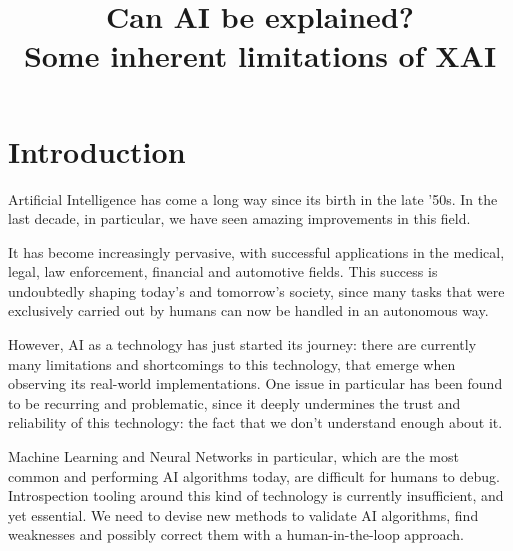 \documentclass[conference]{IEEEtran}
\newcommand{\note}{\todo[]}
\begin{document}
\title{Can AI be explained?\\
    Some inherent limitations of XAI}

\author{
}

\maketitle

\begin{abstract}
\end{abstract}

\section{Introduction}
\label{sec:intro}

Artificial Intelligence has come a long way since its birth in the late '50s.
\note {cit?} In the last decade, in particular, we have seen amazing
improvements in this field.

It has become increasingly pervasive, with successful applications in the
medical, legal, law enforcement, financial and automotive fields. This success
is undoubtedly shaping today's and tomorrow's society, since many tasks that
were exclusively carried out by humans can now be handled in an autonomous way.


However, AI as a technology has just started its journey: there are currently
many limitations and shortcomings to this technology, that emerge when observing
its real-world implementations. One issue in particular has been found to be
recurring and problematic, since it deeply undermines the trust and reliability
of this technology: the fact that we don't understand enough about it.

Machine Learning and Neural Networks in particular, which are the most common
and performing AI algorithms today, are difficult for humans to debug.
Introspection tooling around this kind of technology is currently insufficient,
and yet essential. We need to devise new methods to validate AI algorithms, find
weaknesses and possibly correct them with a human-in-the-loop approach.
\end{document}
